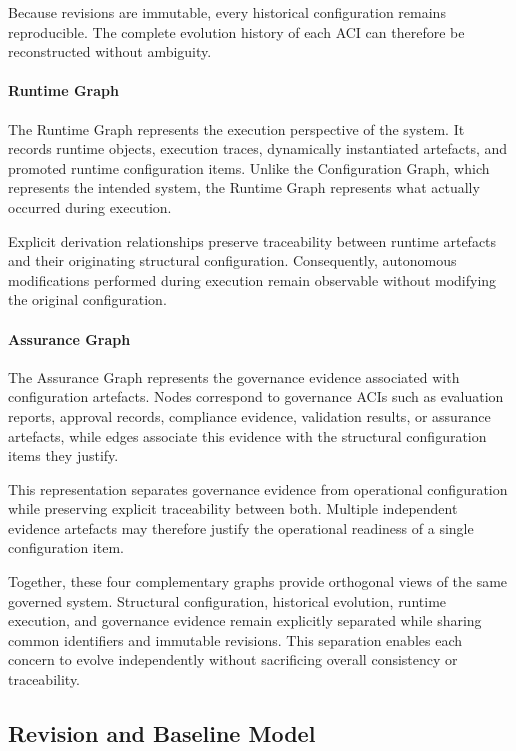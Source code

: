 \documentclass[10pt]{article}
\begin{document}
Because revisions are immutable, every historical configuration remains reproducible. The complete evolution history of each ACI can therefore be reconstructed without ambiguity.

\paragraph{Runtime Graph}

The Runtime Graph represents the execution perspective of the system. It records runtime objects, execution traces, dynamically instantiated artefacts, and promoted runtime configuration items. Unlike the Configuration Graph, which represents the intended system, the Runtime Graph represents what actually occurred during execution.

Explicit derivation relationships preserve traceability between runtime artefacts and their originating structural configuration. Consequently, autonomous modifications performed during execution remain observable without modifying the original configuration.

\paragraph{Assurance Graph}

The Assurance Graph represents the governance evidence associated with configuration artefacts. Nodes correspond to governance ACIs such as evaluation reports, approval records, compliance evidence, validation results, or assurance artefacts, while edges associate this evidence with the structural configuration items they justify.

This representation separates governance evidence from operational configuration while preserving explicit traceability between both. Multiple independent evidence artefacts may therefore justify the operational readiness of a single configuration item.

Together, these four complementary graphs provide orthogonal views of the same governed system. Structural configuration, historical evolution, runtime execution, and governance evidence remain explicitly separated while sharing common identifiers and immutable revisions. This separation enables each concern to evolve independently without sacrificing overall consistency or traceability.

\subsection{Revision and Baseline Model}
\label{sec:revision_baseline}
\end{document}
